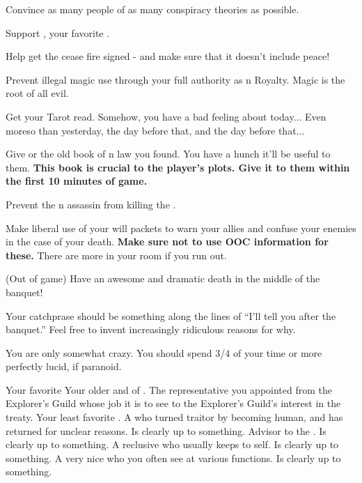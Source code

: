 \documentclass[char]{NeptuneBall}
\begin{document}
\begin{itemz}[Goals]
  \item Convince as many people of as many conspiracy theories as possible.
  \item Support \cPrincess{}, your favorite \cPrincess{\nephew}.
  \item Help \cKing{} get the cease fire signed - and make sure that it doesn't include peace!
	\item Prevent illegal magic use through your full authority as \pAtlantis{}n Royalty. Magic is the root of all evil.
	\item Get your Tarot read. Somehow, you have a bad feeling about today... Even moreso than yesterday, the day before that, and the day before that...
	\item Give \cPrincess{} or \cDiplomat{} the old book of \pPacifica{}n law you found. You have a hunch it'll be useful to them. {\bf This book is crucial to the player's plots. Give it to them within the first 10 minutes of game.}
	\item Prevent the \pPacifica{}n assassin from killing the \cKing{\King}.
	\item Make liberal use of your will packets to warn your allies and confuse your enemies in the case of your death. {\bf Make sure not to use OOC information for these.} There are more in your room if you run out.
	\item (Out of game) Have an awesome and dramatic death in the middle of the banquet!
\end{itemz}

\begin{itemz}[Notes]
  \item Your catchprase should be something along the lines of ``I'll tell you after the banquet.'' Feel free to invent increasingly ridiculous reasons for why.
  \item You are only somewhat crazy. You should spend 3/4 of your time or more perfectly lucid, if paranoid.
\end{itemz}

\begin{contacts}
  \contact{\cPrincess{}} Your favorite \cPrincess{\nephew}
  \contact{\cKing{}} Your older \cKing{\sibling} and \cKing{\King} of \pAtlantis{}.
  \contact{\cPriest{}} The representative you appointed from the Explorer's Guild whose job it is to see to the Explorer's Guild's interest in the treaty.
	\contact{\cAriel{}} Your least favorite \cAriel{\nephew}. A \cAriel{\mer} who turned traitor by becoming human, and has returned for unclear reasons. Is clearly up to something.
	\contact{\cManta{}} Advisor to the \cKing{\King}. Is clearly up to something.
	\contact{\cQueen{}} A reclusive \cQueen{\mer} who usually keeps to \cQueen{\their}self. Is clearly up to something.
	\contact{\cWitch{}} A very nice \cWitch{\mer} who you often see at various functions. Is clearly up to something.
\end{contacts}
\end{document}
